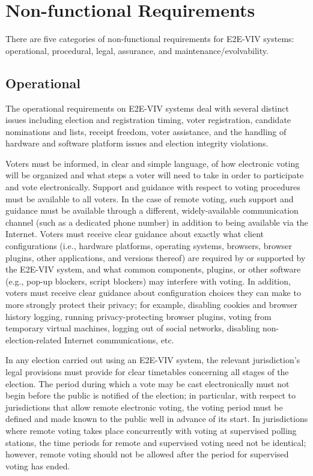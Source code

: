 \section{Non-functional Requirements}

There are five categories of non-functional requirements for E2E-VIV
systems: operational, procedural, legal, assurance, and
maintenance/evolvability.

\subsection{Operational}
\label{req:operational}

The operational requirements on E2E-VIV systems deal with several
distinct issues including election and registration timing, voter
registration, candidate nominations and lists, receipt freedom, voter
assistance, and the handling of hardware and software platform issues
and election integrity violations.

Voters must be informed, in clear and simple language, of how
electronic voting will be organized and what steps a voter will need
to take in order to participate and vote electronically. Support and
guidance with respect to voting procedures must be available to all
voters. In the case of remote voting, such support and guidance must
be available through a different, widely-available communication
channel (such as a dedicated phone number) in addition to being
available via the Internet. Voters must receive clear guidance about
exactly what client configurations (i.e., hardware platforms,
operating systems, browsers, browser plugins, other applications, and
versions thereof) are required by or supported by the E2E-VIV system,
and what common components, plugins, or other software (e.g., pop-up
blockers, script blockers) may interfere with voting. In addition,
voters must receive clear guidance about configuration choices they
can make to more strongly protect their privacy; for example,
disabling cookies and browser history logging, running
privacy-protecting browser plugins, voting from temporary virtual
machines, logging out of social networks, disabling
non-election-related Internet communications, etc.

In any election carried out using an E2E-VIV system, the relevant
jurisdiction's legal provisions must provide for clear timetables
concerning all stages of the election. The period during which a vote
may be cast electronically must not begin before the public is
notified of the election; in particular, with respect to jurisdictions
that allow remote electronic voting, the voting period must be defined
and made known to the public well in advance of its start. In
jurisdictions where remote voting takes place concurrently with voting
at supervised polling stations, the time periods for remote and
supervised voting need not be identical; however, remote voting should
not be allowed after the period for supervised voting has ended.

